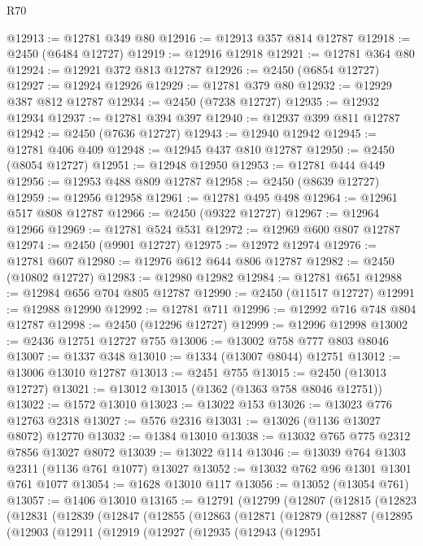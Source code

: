 \begin{lexlean}{R70}
\begin{coremodule}
@12913 := @12781 @349 @80
@12916 := @12913 @357 @814 @12787
@12918 := @2450 (@6484 @12727)
@12919 := @12916 @12918
@12921 := @12781 @364 @80
@12924 := @12921 @372 @813 @12787
@12926 := @2450 (@6854 @12727)
@12927 := @12924 @12926
@12929 := @12781 @379 @80
@12932 := @12929 @387 @812 @12787
@12934 := @2450 (@7238 @12727)
@12935 := @12932 @12934
@12937 := @12781 @394 @397
@12940 := @12937 @399 @811 @12787
@12942 := @2450 (@7636 @12727)
@12943 := @12940 @12942
@12945 := @12781 @406 @409
@12948 := @12945 @437 @810 @12787
@12950 := @2450 (@8054 @12727)
@12951 := @12948 @12950
@12953 := @12781 @444 @449
@12956 := @12953 @488 @809 @12787
@12958 := @2450 (@8639 @12727)
@12959 := @12956 @12958
@12961 := @12781 @495 @498
@12964 := @12961 @517 @808 @12787
@12966 := @2450 (@9322 @12727)
@12967 := @12964 @12966
@12969 := @12781 @524 @531
@12972 := @12969 @600 @807 @12787
@12974 := @2450 (@9901 @12727)
@12975 := @12972 @12974
@12976 := @12781 @607
@12980 := @12976 @612 @644 @806 @12787
@12982 := @2450 (@10802 @12727)
@12983 := @12980 @12982
@12984 := @12781 @651
@12988 := @12984 @656 @704 @805 @12787
@12990 := @2450 (@11517 @12727)
@12991 := @12988 @12990
@12992 := @12781 @711
@12996 := @12992 @716 @748 @804 @12787
@12998 := @2450 (@12296 @12727)
@12999 := @12996 @12998
@13002 := @2436 @12751 @12727 @755
@13006 := @13002 @758 @777 @803 @8046
@13007 := @1337 @348
@13010 := @1334 (@13007 @8044) @12751
@13012 := @13006 @13010 @12787
@13013 := @2451 @755
@13015 := @2450 (@13013 @12727)
@13021 := @13012 @13015 (@1362 (@1363 @758 @8046 @12751))
@13022 := @1572 @13010
@13023 := @13022 @153
@13026 := @13023 @776 @12763 @2318
@13027 := @576 @2316
@13031 := @13026 (@1136 @13027 @8072) @12770
@13032 := @1384 @13010
@13038 := @13032 @765 @775 @2312 @7856 @13027 @8072
@13039 := @13022 @114
@13046 := @13039 @764 @1303 @2311 (@1136 @761 @1077) @13027
@13052 := @13032 @762 @96 @1301 @1301 @761 @1077
@13054 := @1628 @13010 @117
@13056 := @13052 (@13054 @761)
@13057 := @1406 @13010
@13165 := @12791
    (@12799
      (@12807
        (@12815
          (@12823
            (@12831
              (@12839
                (@12847
                  (@12855
                    (@12863
                      (@12871
                        (@12879
                          (@12887
                            (@12895
                              (@12903
                                (@12911
                                  (@12919
                                    (@12927
                                      (@12935
                                        (@12943
                                          (@12951

\end{coremodule}
\end{lexlean}
